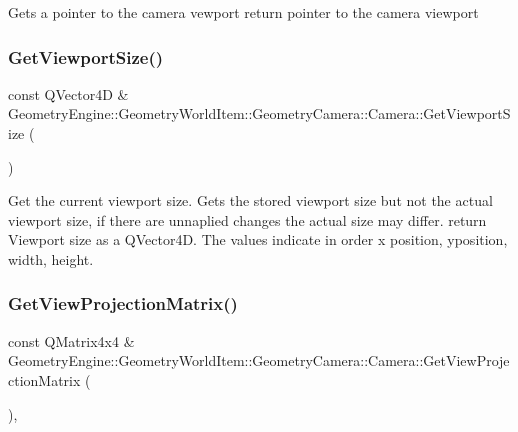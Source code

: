 Gets a pointer to the camera vewport return pointer to the camera viewport \mbox{\label{class_geometry_engine_1_1_geometry_world_item_1_1_geometry_camera_1_1_camera_a633facf8168c7bc943e256732cfb78dc}} 
\subsubsection{\texorpdfstring{GetViewportSize()}{GetViewportSize()}}
{\footnotesize\ttfamily const Q\+Vector4D \& Geometry\+Engine\+::\+Geometry\+World\+Item\+::\+Geometry\+Camera\+::\+Camera\+::\+Get\+Viewport\+Size (\begin{DoxyParamCaption}{ }\end{DoxyParamCaption})\hspace{0.3cm}{\ttfamily [virtual]}}

Get the current viewport size. Gets the stored viewport size but not the actual viewport size, if there are unnaplied changes the actual size may differ. return Viewport size as a Q\+Vector4D. The values indicate in order x position, yposition, width, height. \mbox{\label{class_geometry_engine_1_1_geometry_world_item_1_1_geometry_camera_1_1_camera_a22afa49db8d7aa71d24b9fed728ab381}} 
\subsubsection{\texorpdfstring{GetViewProjectionMatrix()}{GetViewProjectionMatrix()}}
{\footnotesize\ttfamily const Q\+Matrix4x4 \& Geometry\+Engine\+::\+Geometry\+World\+Item\+::\+Geometry\+Camera\+::\+Camera\+::\+Get\+View\+Projection\+Matrix (\begin{DoxyParamCaption}{ }\end{DoxyParamCaption})\hspace{0.3cm}{\ttfamily [inline]}, {\ttfamily [virtual]}}

